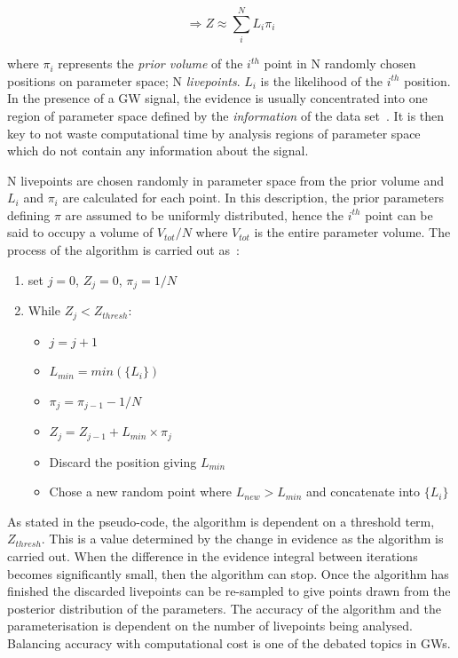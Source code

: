 \documentclass{jpconf}
\begin{document}
\begin{equation*}
  \Rightarrow Z \approx \sum \limits_i^N L_i\pi_i
\end{equation*}

where $\pi_i$ represents the \textit{prior volume} of the $i^{th}$ point in N randomly chosen positions on parameter space; N \textit{livepoints}. $L_{i}$ is the likelihood of the $i^{th}$ position. In the presence of a GW signal, the evidence is usually concentrated into one region of parameter space defined by the \textit{information} of the data set~\cite{Sivia}. It is then key to not waste computational time by analysis regions of parameter space which do not contain any information about the signal. 

N livepoints are chosen randomly in parameter space from the prior volume and $L_{i}$ and $\pi_{i}$ are calculated for each point. In this description, the prior parameters defining $\pi$ are assumed to be uniformly distributed, hence the $i^{th}$ point can be said to occupy a volume of $V_{tot}/N$ where $V_{tot}$ is the entire parameter volume.   
The process of the algorithm is carried out as~\cite{JVei}:
\begin{enumerate}
\item set $j = 0$, $Z_{j} = 0$, $\pi_{j} = 1/N$ 
\item While $Z_{j} < Z_{thresh}$:
  \begin{itemize}
  \item $j = j + 1$
  \item $L_{min} = min(\{L_{i}\})$
  \item $\pi_{j} = \pi_{j-1} - 1/N $
  \item $Z_{j} = Z_{j-1} + L_{min}\times \pi_{j}$
  \item Discard the position giving $L_{min}$
  \item Chose a new random point where $L_{new}>L_{min}$ and concatenate into $\{L_{i}\}$
  \end{itemize}

\end{enumerate}

As stated in the pseudo-code, the algorithm is dependent on a threshold term, $Z_{thresh}$. This is a value determined by the change in evidence as the algorithm is carried out. When the difference in the evidence integral between iterations becomes significantly small, then the algorithm can stop. Once the algorithm has finished the discarded livepoints can be re-sampled to give points drawn from the posterior distribution of the parameters. The accuracy of the algorithm and the parameterisation is dependent on the number of livepoints being analysed. Balancing accuracy with computational cost is one of the debated topics in GWs.
\end{document}
